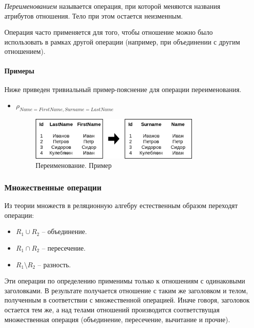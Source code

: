 \begin{definition}
	\textit{Переименованием} называется операция, при которой меняются названия
	атрибутов отношения. Тело при этом остается неизменным.
\end{definition}

Операция часто применяется для того, чтобы отношение можно было использовать в рамках другой
операции (например, при объединении с другим отношением).

\paragraph{Примеры}
Ниже приведен тривиальный пример-пояснение для операции переименования.

\begin{itemize}
	\item $\rho_{Name=FirstName, Surname=LastName}$
	      \begin{figure}[H]
		      \centering
		      \includegraphics[width=0.8\textwidth]{../assets/kgeorgiy/relalgebra/Primitive_Rename_2.svg.png}
		      \caption{Переименование. Пример}
		      \label{ren-ex}
	      \end{figure}
\end{itemize}

\subsubsection{Множественные операции}

Из теории множеств в реляционную алгебру естественным образом переходят операции:
\begin{itemize}
	\item $R_1 \cup R_2$ -- объединение.
	\item $R_1 \cap R_2$ -- пересечение.
	\item $R_1 \setminus R_2$ -- разность.
\end{itemize}

Эти операции по определению применимы только к отношениям с одинаковыми заголовками. В результате
получается отношение с таким же заголовком и телом, полученным в соответствии с множественной
операцией. Иначе говоря, заголовок остается тем же, а над телами отношений производится
соответствущая множественная операция (объединение, пересечение, вычитание и прочие).

